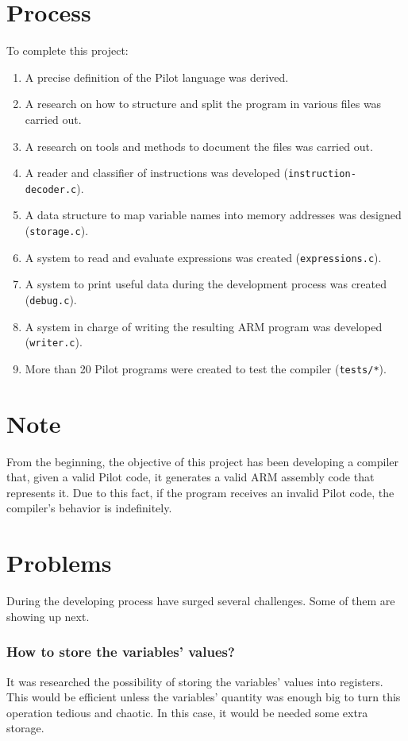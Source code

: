 \documentclass[12pt,spanish]{article}
\begin{document}
\section{Process}
To complete this project:
\begin{enumerate}
\item{A precise definition of the Pilot language was derived.}
\item{A research on how to structure and split the program in various files was carried out.}
\item{A research on tools and methods to document the files was carried out.}
\item{A reader and classifier of instructions was developed (\texttt{instruction-decoder.c}).}
\item{A data structure to map variable names into memory addresses was designed (\texttt{storage.c}).}
\item{A system to read and evaluate expressions was created (\texttt{expressions.c}).}
\item{A system to print useful data during the development process was created (\texttt{debug.c}).}
\item{A system in charge of writing the resulting ARM program was developed (\texttt{writer.c}).}
\item{More than 20 Pilot programs were created to test the compiler (\texttt{tests/*}).}
\end{enumerate}

\section{Note}
From the beginning, the objective of this project has been developing a compiler that, given a valid Pilot code, it generates a valid ARM assembly code that represents it. Due to this fact, if the program receives an invalid Pilot code, the compiler's behavior is indefinitely.

\section{Problems}
During the developing process have surged several challenges. Some of them are showing up next.

\subsubsection{How to store the variables' values?}

It was researched the possibility of storing the variables' values into registers. This would be efficient unless the variables' quantity was enough big to turn this operation tedious and chaotic. In this case, it would be needed some extra storage.
\end{document}

